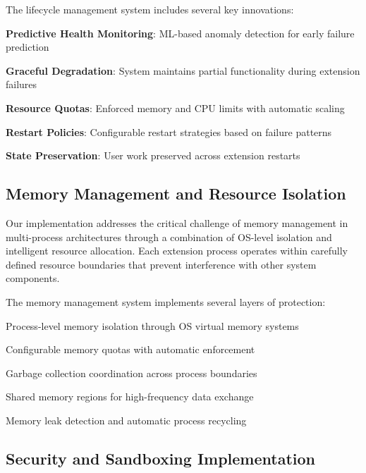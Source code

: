 The lifecycle management system includes several key innovations:

\begin{expandedlist}
    \item \textbf{Predictive Health Monitoring}: ML-based anomaly detection for early failure prediction
    \item \textbf{Graceful Degradation}: System maintains partial functionality during extension failures
    \item \textbf{Resource Quotas}: Enforced memory and CPU limits with automatic scaling
    \item \textbf{Restart Policies}: Configurable restart strategies based on failure patterns
    \item \textbf{State Preservation}: User work preserved across extension restarts
\end{expandedlist}

\subsection*{Memory Management and Resource Isolation}

Our implementation addresses the critical challenge of memory management in multi-process architectures through a combination of OS-level isolation and intelligent resource allocation. Each extension process operates within carefully defined resource boundaries that prevent interference with other system components.

The memory management system implements several layers of protection:

\begin{compactlist}
    \item Process-level memory isolation through OS virtual memory systems
    \item Configurable memory quotas with automatic enforcement
    \item Garbage collection coordination across process boundaries
    \item Shared memory regions for high-frequency data exchange
    \item Memory leak detection and automatic process recycling
\end{compactlist}

\subsection*{Security and Sandboxing Implementation}

